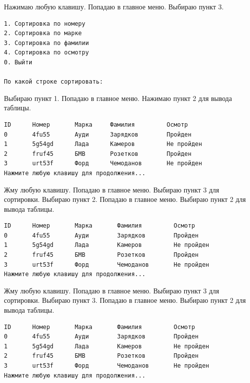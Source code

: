 \documentclass[12pt, a4paper]{article}
\begin{document}
Нажимаю любую клавишу. Попадаю в главное меню. Выбираю пункт 3.

\begin{tcolorbox}
\begin{verbatim}
1. Сортировка по номеру
2. Сортировка по марке  
3. Сортировка по фамилии
4. Сортировка по осмотру
0. Выйти

По какой строке сортировать: 
\end{verbatim}
\end{tcolorbox}

Выбираю пункт 1. Попадаю в главное меню. Нажимаю пункт 2 для вывода таблицы.

\begin{tcolorbox}
\begin{verbatim}
ID      Номер       Марка     Фамилия         Осмотр
0       4fu55       Ауди      Зарядков        Пройден
1       5g54gd      Лада      Камеров         Не пройден
2       fruf45      БМВ       Розетков        Пройден
3       urt53f      Форд      Чемоданов       Не пройден
Нажмите любую клавишу для продолжения...
\end{verbatim}
\end{tcolorbox}

Жму любую клавишу. Попадаю в главное меню. Выбираю пункт 3 для сортировки. Выбираю пункт 2. Попадаю в главное меню. Выбираю пункт 2 для вывода таблицы.

\begin{tcolorbox}
\begin{verbatim}
ID      Номер       Марка       Фамилия         Осмотр
0       4fu55       Ауди        Зарядков        Пройден
1       5g54gd      Лада        Камеров         Не пройден
2       fruf45      БМВ         Розетков        Пройден
3       urt53f      Форд        Чемоданов       Не пройден
Нажмите любую клавишу для продолжения...
\end{verbatim}
\end{tcolorbox}

Жму любую клавишу. Попадаю в главное меню. Выбираю пункт 3 для сортировки. Выбираю пункт 3. Попадаю в главное меню. Выбираю пункт 2 для вывода таблицы.

\begin{tcolorbox}
\begin{verbatim}
ID      Номер       Марка       Фамилия         Осмотр
0       4fu55       Ауди        Зарядков        Пройден
1       5g54gd      Лада        Камеров         Не пройден
2       fruf45      БМВ         Розетков        Пройден
3       urt53f      Форд        Чемоданов       Не пройден
Нажмите любую клавишу для продолжения...
\end{verbatim}
\end{tcolorbox}
\end{document}
